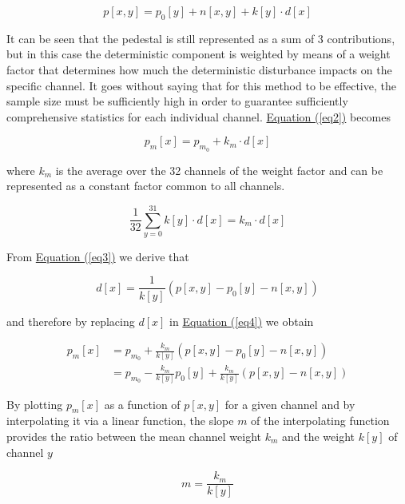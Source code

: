\begin{equation} \label{eq3}
    p[x,y] = p_0[y] + n[x,y] + k[y] \cdot d[x]
\end{equation}

\noindent
It can be seen that the pedestal is still represented as a sum of 3 contributions, but in this case the deterministic component is weighted by means of a weight factor that determines how much the deterministic disturbance impacts on the specific channel. It goes without saying that for this method to be effective, the sample size must be sufficiently high in order to guarantee sufficiently comprehensive statistics for each individual channel. \hyperref[eq2]{Equation (\ref{eq2})} becomes

\begin{equation} \label{eq4}
    p_m[x] = p_{m_0} + k_m \cdot d[x]
\end{equation}

\noindent
where $k_m$ is the average over the 32 channels of the weight factor and can be represented as a constant factor common to all channels.

\begin{equation}
    \frac{1}{32} \sum_{y=0}^{31} k[y] \cdot d[x] = k_m \cdot d[x]
\end{equation}

\noindent
From \hyperref[eq3]{Equation (\ref{eq3})} we derive that

\begin{equation}
    d[x] = \frac{1}{k[y]} (p[x,y] - p_0[y] - n[x,y])
\end{equation}

\noindent
and therefore by replacing $d[x]$ in \hyperref[eq4]{Equation (\ref{eq4})} we obtain

\begin{equation}
    \begin{split}
        p_m[x] & = p_{m_0} + \frac{k_m}{k[y]}(p[x,y] - p_0[y] - n[x,y]) \\
        & = p_{m_0} - \frac{k_m}{k[y]} p_0[y] + \frac{k_m}{k[y]} (p[x,y] - n[x,y])
    \end{split}
\end{equation}

\noindent
By plotting $p_m[x]$ as a function of $p[x,y]$ for a given channel and by interpolating it via a linear function, the slope $m$ of the interpolating function provides the ratio between the mean channel weight $k_m$ and the weight $k[y]$ of channel $y$

\begin{equation}
    m = \frac{k_m}{k[y]}
\end{equation}


